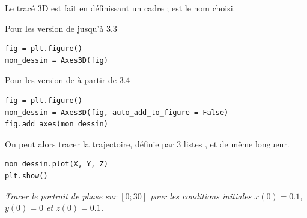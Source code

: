Le tracé 3D est fait en définissant un cadre ;  est le nom choisi.

Pour les version de  jusqu'à 3.3
\begin{lstlisting}
fig = plt.figure()
mon_dessin = Axes3D(fig)
\end{lstlisting}

Pour les version de  à partir de 3.4
\begin{lstlisting}
fig = plt.figure()
mon_dessin = Axes3D(fig, auto_add_to_figure = False)
fig.add_axes(mon_dessin)
\end{lstlisting}

On peut alors tracer la trajectoire, définie par 3 listes ,  et  de même longueur.
\begin{lstlisting}
mon_dessin.plot(X, Y, Z) 
plt.show()
\end{lstlisting}
\begin{Exercise}\it
Tracer le portrait de phase sur $[0;30]$ pour les conditions initiales $x(0) =0.1$, $y(0) =0$ et $z(0) =0.1$.
\end{Exercise}
